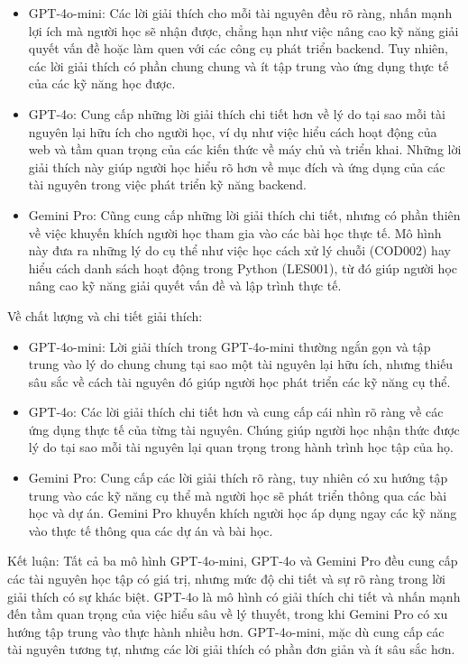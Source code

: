 \begin{itemize}
    \item GPT-4o-mini: Các lời giải thích cho mỗi tài nguyên đều rõ ràng, nhấn mạnh lợi ích mà người học sẽ nhận được, chẳng hạn như việc nâng cao kỹ năng giải quyết vấn đề hoặc làm quen với các công cụ phát triển backend. Tuy nhiên, các lời giải thích có phần chung chung và ít tập trung vào ứng dụng thực tế của các kỹ năng học được.
    \item GPT-4o: Cung cấp những lời giải thích chi tiết hơn về lý do tại sao mỗi tài nguyên lại hữu ích cho người học, ví dụ như việc hiểu cách hoạt động của web và tầm quan trọng của các kiến thức về máy chủ và triển khai. Những lời giải thích này giúp người học hiểu rõ hơn về mục đích và ứng dụng của các tài nguyên trong việc phát triển kỹ năng backend.
    \item Gemini Pro: Cũng cung cấp những lời giải thích chi tiết, nhưng có phần thiên về việc khuyến khích người học tham gia vào các bài học thực tế. Mô hình này đưa ra những lý do cụ thể như việc học cách xử lý chuỗi (COD002) hay hiểu cách danh sách hoạt động trong Python (LES001), từ đó giúp người học nâng cao kỹ năng giải quyết vấn đề và lập trình thực tế.
\end{itemize}
Về chất lượng và chi tiết giải thích:
\begin{itemize}
    \item GPT-4o-mini: Lời giải thích trong GPT-4o-mini thường ngắn gọn và tập trung vào lý do chung chung tại sao một tài nguyên lại hữu ích, nhưng thiếu sâu sắc về cách tài nguyên đó giúp người học phát triển các kỹ năng cụ thể.
    \item GPT-4o: Các lời giải thích chi tiết hơn và cung cấp cái nhìn rõ ràng về các ứng dụng thực tế của từng tài nguyên. Chúng giúp người học nhận thức được lý do tại sao mỗi tài nguyên lại quan trọng trong hành trình học tập của họ.
    \item Gemini Pro: Cung cấp các lời giải thích rõ ràng, tuy nhiên có xu hướng tập trung vào các kỹ năng cụ thể mà người học sẽ phát triển thông qua các bài học và dự án. Gemini Pro khuyến khích người học áp dụng ngay các kỹ năng vào thực tế thông qua các dự án và bài học.
\end{itemize}
Kết luận: Tất cả ba mô hình GPT-4o-mini, GPT-4o và Gemini Pro đều cung cấp các tài nguyên học tập có giá trị, nhưng mức độ chi tiết và sự rõ ràng trong lời giải thích có sự khác biệt. GPT-4o là mô hình có giải thích chi tiết và nhấn mạnh đến tầm quan trọng của việc hiểu sâu về lý thuyết, trong khi Gemini Pro có xu hướng tập trung vào thực hành nhiều hơn. GPT-4o-mini, mặc dù cung cấp các tài nguyên tương tự, nhưng các lời giải thích có phần đơn giản và ít sâu sắc hơn.
